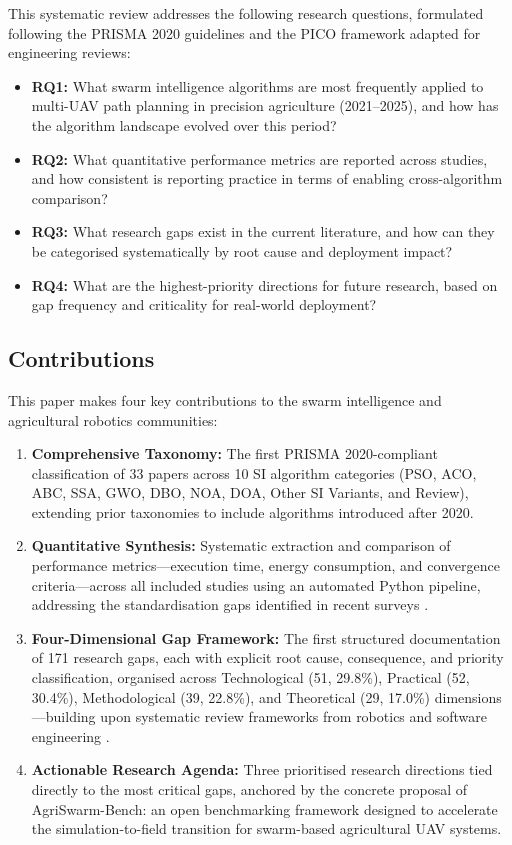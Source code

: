 \documentclass[review,3p,times]{elsarticle}
\begin{document}
This systematic review addresses the following research questions, formulated following the PRISMA 2020 guidelines \cite{page2021} and the PICO framework adapted for engineering reviews:

\begin{itemize}
  \item \textbf{RQ1:} What swarm intelligence algorithms are most frequently applied to multi-UAV path planning in precision agriculture (2021--2025), and how has the algorithm landscape evolved over this period?
  \item \textbf{RQ2:} What quantitative performance metrics are reported across studies, and how consistent is reporting practice in terms of enabling cross-algorithm comparison?
  \item \textbf{RQ3:} What research gaps exist in the current literature, and how can they be categorised systematically by root cause and deployment impact?
  \item \textbf{RQ4:} What are the highest-priority directions for future research, based on gap frequency and criticality for real-world deployment?
\end{itemize}

\subsection{Contributions}

This paper makes four key contributions to the swarm intelligence and agricultural robotics communities:

\begin{enumerate}
    \item \textbf{Comprehensive Taxonomy:} The first PRISMA 2020-compliant classification of 33 papers across 10 SI algorithm categories (PSO, ACO, ABC, SSA, GWO, DBO, NOA, DOA, Other SI Variants, and Review), extending prior taxonomies \cite{chung2018,brambilla2013,puente2022,sharma2022} to include algorithms introduced after 2020.
    \item \textbf{Quantitative Synthesis:} Systematic extraction and comparison of performance metrics---execution time, energy consumption, and convergence criteria---across all included studies using an automated Python pipeline, addressing the standardisation gaps identified in recent surveys \cite{phung2021,pan2022,aitsaadi2022}.
    \item \textbf{Four-Dimensional Gap Framework:} The first structured documentation of 171 research gaps, each with explicit root cause, consequence, and priority classification, organised across Technological (51, 29.8\%), Practical (52, 30.4\%), Methodological (39, 22.8\%), and Theoretical (29, 17.0\%) dimensions---building upon systematic review frameworks from robotics and software engineering \cite{brambilla2013,bayindir2016}.
    \item \textbf{Actionable Research Agenda:} Three prioritised research directions tied directly to the most critical gaps, anchored by the concrete proposal of AgriSwarm-Bench: an open benchmarking framework designed to accelerate the simulation-to-field transition for swarm-based agricultural UAV systems.
\end{enumerate}
\end{document}
